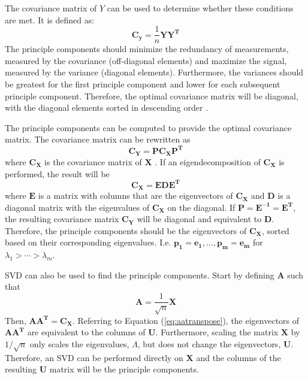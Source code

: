 \documentclass[conference]{IEEEtran}
\begin{document}
    	The covariance matrix of $Y$ can be used to determine whether these conditions are met. It is defined as:
	\begin{equation}
		\mathbf{C_y} = \frac{1}{n}{\mathbf{YY^T}}
	\end{equation} 
	The principle components should minimize the redundancy of measurements, measured by the covariance (off-diagonal elements) and maximize the signal, measured by the variance (diagonal elements). Furthermore, the variances should be greatest for the first principle component and lower for each subsequent principle component. Therefore, the optimal covariance matrix will be diagonal, with the diagonal elements sorted in descending order \cite{shlens_2014_tutorial}.
	
	The principle components can be computed to provide the optimal covariance matrix. The covariance matrix can be rewritten as
	\begin{equation}
		\mathbf{\mathbf{C_Y}} = {\mathbf{PC_XP^T}}
	\end{equation}
	where $\mathbf{C_X}$ is the covariance matrix of $\mathbf{X}$ \cite{shlens_2014_tutorial}. If an eigendecomposition of $\mathbf{C_X}$ is performed, the result will be
	\begin{equation}
		\mathbf{C_X} = \mathbf{EDE^T}
	\end{equation}
	where $\mathbf{E}$ is a matrix with columns that are the eigenvectors of $\mathbf{C_X}$ and $\mathbf{D}$ is a diagonal matrix with the eigenvalues of $\mathbf{C_X}$ on the diagonal. If $\mathbf{P} = \mathbf{E^{-1}} = \mathbf{E^T}$, the resulting covariance matrix $\mathbf{C_Y}$ will be diagonal and equivalent to $\mathbf{D}$. Therefore, the principle components should be the eigenvectors of $\mathbf{C_X}$, sorted based on their corresponding eigenvalues. I.e. \newline $\mathbf{p_1} = \mathbf{e_1}, ..., \mathbf{p_m} = \mathbf{e_m}$ for $\lambda_1 > \cdots > \lambda_m$. 
	
	SVD can also be used to find the principle components. Start by defining $\mathbf{A}$ such that
	\begin{equation*}
		\mathbf{A} = \frac{1}{\sqrt{n}}\mathbf{X}
	\end{equation*}
	Then, $\mathbf{AA^T} = \mathbf{C_X}$. Referring to Equation (\ref{eq:aatranspose}), the eigenvectors of $\mathbf{AA^T}$ are equivalent to the columns of $\mathbf{U}$. Furthermore, scaling the matrix $\mathbf{X}$ by $1/\sqrt{n}$ only scales the eigenvalues, $\Lambda$, but does not change the eigenvectors, $\mathbf{U}$. Therefore, an SVD can be performed directly on $\mathbf{X}$ and the columns of the resulting $\mathbf{U}$ matrix will be the principle components.
    
\end{document}
